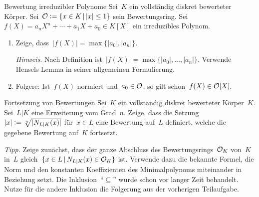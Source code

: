 \documentclass{uebblatt}
\begin{document}
\begin{aufgabe}{Bewertung irreduzibler Polynome}
Sei~$K$ ein vollständig diskret bewerteter Körper. Sei~$\mathcal{O} \vcentcolon= \{ x \in K
\,|\, |x| \leq 1 \}$ sein Bewertungsring. Sei~$f(X) = a_n X^n + \cdots
+ a_1 X + a_0 \in K[X]$ ein irreduzibles Polynom.
\begin{enumerate}
\item Zeige, dass~$|f(X)| = \max\{|a_0|,|a_n|\}$.

{\tiny\emph{Hinweis.} Nach Definition ist~$|f(X)| =
\max\{|a_0|,\ldots,|a_n|\}$. Verwende Hensels Lemma in seiner allgemeinen
Formulierung.\par}
\item Folgere: Ist~$f(X)$ normiert und~$a_0 \in \mathcal{O}$, so gilt schon~$f(X) \in
\mathcal{O}[X]$.
\end{enumerate}
\end{aufgabe}

\begin{aufgabe}{Fortsetzung von Bewertungen}
Sei~$K$ ein vollständig diskret bewerteter Körper~$K$. Sei~$L|K$ eine
Erweiterung vom Grad~$n$. Zeige, dass die Setzung~$|x| \vcentcolon=
\sqrt[n]{|N_{L|K}(x)|}$ für~$x \in L$ eine Bewertung auf~$L$ definiert, welche
die gegebene Bewertung auf~$K$ fortsetzt.

{\tiny\emph{Tipp.} Zeige zunächst, dass der ganze Abschluss des
Bewertungsrings~$\mathcal{O}_K$ von~$K$ in~$L$ gleich~$\{ x \in L \,|\, N_{L|K}(x) \in
\mathcal{O}_K \}$ ist. Verwende dazu die bekannte Formel, die Norm und den konstanten
Koeffizienten des Minimalpolynoms miteinander in Beziehung setzt. Die
Inklusion~"`$\subseteq$"' wurde schon vor langer Zeit behandelt. Nutze für die
andere Inklusion die Folgerung aus der vorherigen Teilaufgabe.\par}
\end{aufgabe}
\end{document}
